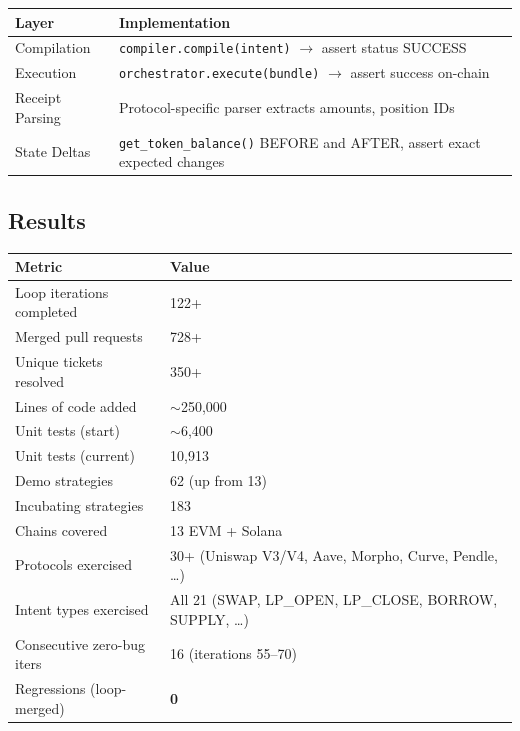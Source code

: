 \documentclass[11pt,a4paper]{article}
\newcounter{none} %
\begin{document}
{\def\LTcaptype{none} %
\begin{longtable}[]{@{}
  >{\raggedright\arraybackslash}p{}
  >{\raggedright\arraybackslash}p{}@{}}
\toprule\noalign{}
\begin{minipage}[b]{\linewidth}\raggedright
Layer
\end{minipage} & \begin{minipage}[b]{\linewidth}\raggedright
Implementation
\end{minipage} \\
\midrule\noalign{}
\endhead
\bottomrule\noalign{}
\endlastfoot
Compilation & \texttt{compiler.compile(intent)} $\rightarrow$ assert status SUCCESS \\
Execution & \texttt{orchestrator.execute(bundle)} $\rightarrow$ assert success on-chain \\
Receipt Parsing & Protocol-specific parser extracts amounts, position IDs \\
State Deltas & \texttt{get\_token\_balance()} BEFORE and AFTER, assert exact expected changes \\
\end{longtable}
}

\subsection{Results}\label{sec:results-122-iterations}

\begin{table}[H]
\centering
\small
\renewcommand{\arraystretch}{1.4}
\begin{tabular*}{\textwidth}{@{\extracolsep{\fill}} l l @{}}
\toprule
\textbf{Metric} & \textbf{Value} \\
\midrule
Loop iterations completed  & 122+ \\
Merged pull requests       & 728+ \\
Unique tickets resolved    & 350+ \\
Lines of code added        & $\sim$250{,}000 \\
Unit tests (start)         & $\sim$6{,}400 \\
Unit tests (current)       & 10{,}913 \\
Demo strategies            & 62 (up from 13) \\
Incubating strategies      & 183 \\
Chains covered             & 13 EVM + Solana \\
Protocols exercised        & 30+ (Uniswap V3/V4, Aave, Morpho, Curve, Pendle, \ldots) \\
Intent types exercised     & All 21 (SWAP, LP\_OPEN, LP\_CLOSE, BORROW, SUPPLY, \ldots) \\
Consecutive zero-bug iters & 16 (iterations 55--70) \\
Regressions (loop-merged)  & \textbf{0} \\
\bottomrule
\end{tabular*}
\end{table}
\end{document}
